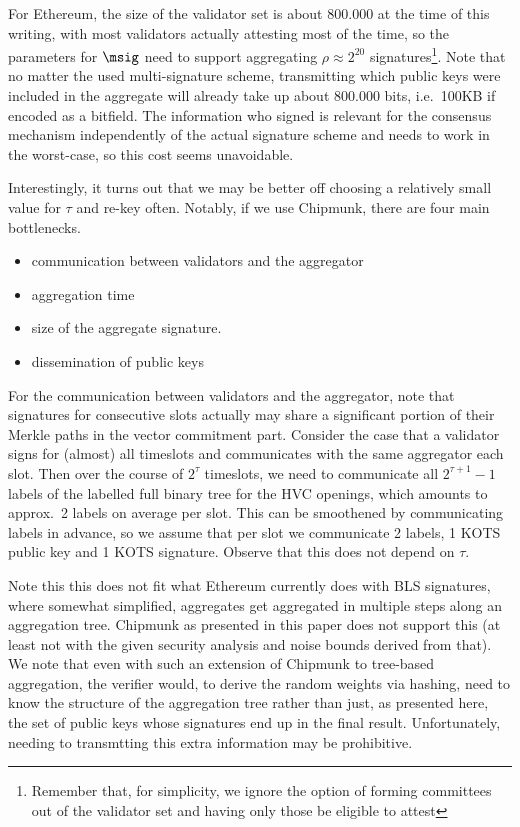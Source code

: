 For Ethereum, the size of the validator set is about $800.000$ at the time of this writing, with most validators actually attesting most of the time, so the parameters for $\msig$ need to support aggregating $\rho\approx 2^{20}$ signatures\footnote{Remember that, for simplicity, we ignore the option of forming committees out of the validator set and having only those be eligible to attest}. Note that no matter the used multi-signature scheme, transmitting which public keys were included in the aggregate will already take up about $800.000$ bits, i.e.\ 100KB if encoded as a bitfield. The information who signed is relevant for the consensus mechanism independently of the actual signature scheme and needs to work in the worst-case, so this cost seems unavoidable. %

Interestingly, it turns out that we may be better off choosing a relatively small value for $\tau$ and re-key often. Notably, if we use Chipmunk, there are four main bottlenecks.
\begin{itemize}
\item communication between validators and the aggregator
\item aggregation time
\item size of the aggregate signature.
\item dissemination of public keys
\end{itemize}
For the communication between validators and the aggregator, note that signatures for consecutive slots actually may share a significant portion of their Merkle paths in the vector commitment part.
Consider the case that a validator signs for (almost) all timeslots and communicates with the same aggregator each slot.
Then over the course of $2^\tau$ timeslots, we need to communicate all $2^{\tau+1} - 1$ labels of the labelled full binary tree for the HVC openings, which amounts to approx.\ 2 labels on average per slot.
This can be smoothened by communicating labels in advance, so we assume that per slot we communicate 2 labels, 1 KOTS public key and 1 KOTS signature.
Observe that this does not depend on $\tau$.

Note this this does not fit what Ethereum currently does with BLS\cite{AC:BonLynSha01} signatures, where somewhat simplified, aggregates get aggregated in multiple steps along an aggregation tree. Chipmunk as presented in this paper does not support this (at least not with the given security analysis and noise bounds derived from that). We note that even with such an extension of Chipmunk to tree-based aggregation, the verifier would, to derive the random weights via hashing, need to know the structure of the aggregation tree rather than just, as presented here, the set of public keys whose signatures end up in the final result. Unfortunately, needing to transmtting this extra information may be prohibitive.

